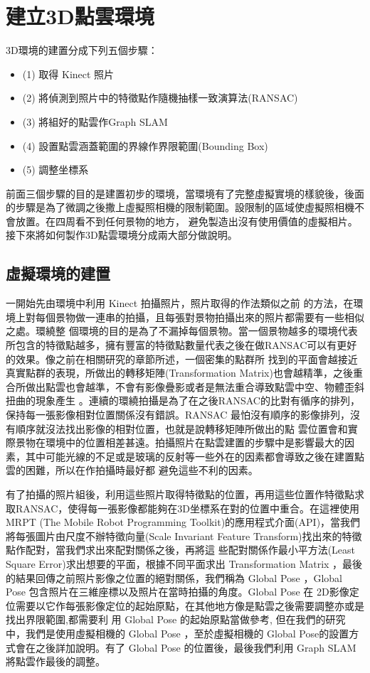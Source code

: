 % 
\section{建立3D點雲環境}
   3D環境的建置分成下列五個步驟：

\begin{itemize}
	\item (1) 取得 Kinect 照片
    \item (2) 將偵測到照片中的特徵點作隨機抽樣一致演算法(RANSAC)
    \item (3) 將組好的點雲作Graph SLAM
    \item (4) 設置點雲涵蓋範圍的界線作界限範圍(Bounding Box)
    \item (5) 調整坐標系
\end{itemize}   
   
   前面三個步驟的目的是建置初步的環境，當環境有了完整虛擬實境的樣貌後，後面的步驟是為了微調之後撒上虛擬照相機的限制範圍。設限制的區域使虛擬照相機不會放置。在四周看不到任何景物的地方，
   避免製造出沒有使用價值的虛擬相片。接下來將如何製作3D點雲環境分成兩大部分做說明。
   
%
\subsection{虛擬環境的建置}
   一開始先由環境中利用 Kinect 拍攝照片，照片取得的作法類似之前 \cite{Du2011}的方法，在環境上對每個景物做一連串的拍攝，且每張對景物拍攝出來的照片都需要有一些相似之處。環繞整
   個環境的目的是為了不漏掉每個景物。當一個景物越多的環境代表所包含的特徵點越多，擁有豐富的特徵點數量代表之後在做RANSAC可以有更好的效果。像之前在相關研究的章節所述，一個密集的點群所
   找到的平面會越接近真實點群的表現，所做出的轉移矩陣(Transformation Matrix)也會越精準，之後重合所做出點雲也會越準，不會有影像疊影或者是無法重合導致點雲中空、物體歪斜扭曲的現象產生
   。連續的環繞拍攝是為了在之後RANSAC的比對有循序的排列，保持每一張影像相對位置關係沒有錯誤。RANSAC 最怕沒有順序的影像排列，沒有順序就沒法找出影像的相對位置，也就是說轉移矩陣所做出的點
   雲位置會和實際景物在環境中的位置相差甚遠。拍攝照片在點雲建置的步驟中是影響最大的因素，其中可能光線的不足或是玻璃的反射等一些外在的因素都會導致之後在建置點雲的困難，所以在作拍攝時最好都
   避免這些不利的因素。
     
     
    有了拍攝的照片組後，利用這些照片取得特徵點的位置，再用這些位置作特徵點求取RANSAC，使得每一張影像都能夠在3D坐標系在對的位置中重合。在這裡使用 MRPT (The Mobile Robot
    Programming Toolkit)的應用程式介面(API)，當我們將每張圖片由尺度不辦特徵向量(Scale Invariant Feature Transform)找出來的特徵點作配對，當我們求出來配對關係之後，再將這
    些配對關係作最小平方法(Least Square Error)求出想要的平面，根據不同平面求出 Transformation Matrix ，最後的結果回傳之前照片影像之位置的絕對關係，我們稱為 Global Pose 
    ，Global Pose 包含照片在三維座標以及照片在當時拍攝的角度。Global Pose 在 2D影像定位需要以它作每張影像定位的起始原點，在其他地方像是點雲之後需要調整亦或是找出界限範圍,都需要利
    用 Global Pose 的起始原點當做參考, 但在我們的研究中，我們是使用虛擬相機的 Global Pose ，至於虛擬相機的 Global Pose的設置方式會在之後詳加說明。有了 Global Pose 
    的位置後，最後我們利用 Graph SLAM 將點雲作最後的調整。
   
